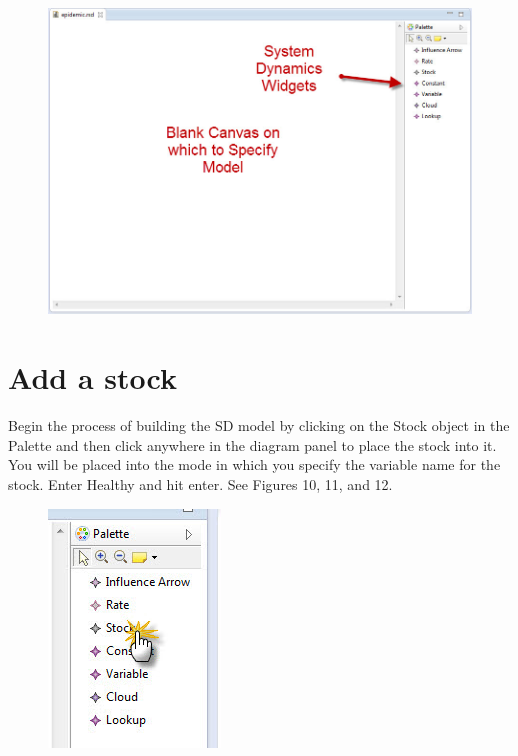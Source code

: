 \documentclass[11pt]{amsart}
\begin{document}
\begin{figure}[ht]
\begin{center}
\vspace{.2in}
\centerline {
\includegraphics[totalheight=0.5\textheight]{images/009.jpg}
}
\caption{}
\label{fig:009}
\end{center}
\end{figure}

\section{Add a stock}
Begin the process of building the SD model by clicking on the Stock object in the Palette and then click anywhere in the diagram panel to place the stock into it. You will be placed into the mode in which you specify the variable name for the stock. Enter Healthy and hit enter. See Figures 10, 11, and 12.



\begin{figure}[ht]
\begin{center}
\vspace{.2in}
\centerline {
\includegraphics{images/010.jpg}
}
\caption{}
\label{fig:010}
\end{center}
\end{figure}
\end{document}
